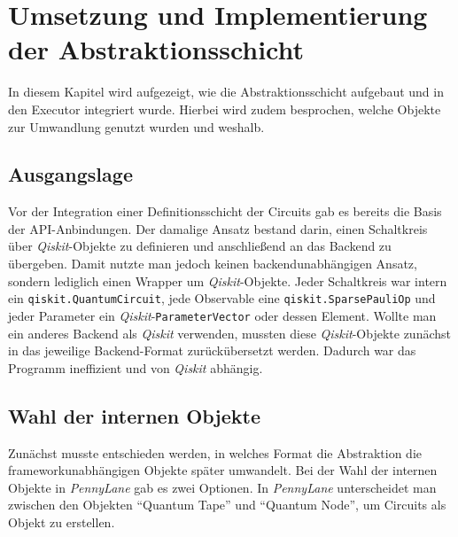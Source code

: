 \chapter{Umsetzung und Implementierung der Abstraktionsschicht}
\label{chap:umsetzung}

In diesem Kapitel wird aufgezeigt, wie die Abstraktionsschicht aufgebaut und in den Executor integriert wurde. Hierbei wird zudem besprochen, welche Objekte zur Umwandlung genutzt wurden und weshalb.

\section{Ausgangslage}
\label{sec:ausgangslage}

Vor der Integration einer Definitionsschicht der Circuits gab es bereits die Basis der API-Anbindungen. Der damalige Ansatz bestand darin, einen Schaltkreis über \textit{Qiskit}-Objekte zu definieren und anschließend an das Backend zu übergeben. Damit nutzte man jedoch keinen backendunabhängigen Ansatz, sondern lediglich einen Wrapper um \textit{Qiskit}-Objekte. Jeder Schaltkreis war intern ein \texttt{qiskit.QuantumCircuit}, jede Observable eine \texttt{qiskit.SparsePauliOp} und jeder Parameter ein \textit{Qiskit}-\texttt{ParameterVector} oder dessen Element. Wollte man ein anderes Backend als \textit{Qiskit} verwenden, mussten diese \textit{Qiskit}-Objekte zunächst in das jeweilige Backend-Format zurückübersetzt werden. Dadurch war das Programm ineffizient und von \textit{Qiskit} abhängig.

\section{Wahl der internen Objekte}
\label{sec:interne-objekte}

Zunächst musste entschieden werden, in welches Format die Abstraktion die frameworkunabhängigen Objekte später umwandelt.
Bei der Wahl der internen Objekte in \textit{PennyLane} gab es zwei Optionen. In \textit{PennyLane} unterscheidet man zwischen den Objekten \enquote{Quantum Tape} und \enquote{Quantum Node}, um Circuits als Objekt zu erstellen.

